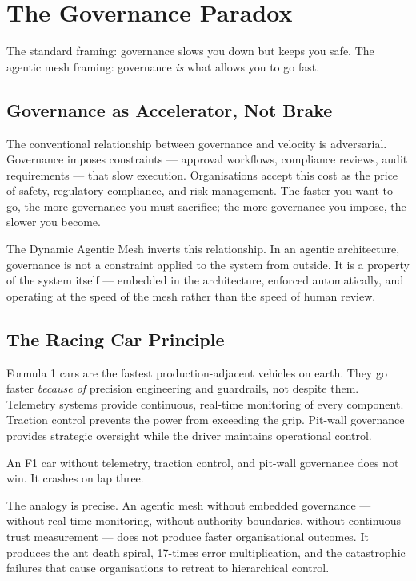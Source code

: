 \chapter{The Governance Paradox}
\label{ch:governance}

\epigraph{The standard framing: governance slows you down but keeps you safe. The agentic mesh framing: governance \emph{is} what allows you to go fast.}{}

\section{Governance as Accelerator, Not Brake}

The conventional relationship between governance and velocity is adversarial. Governance imposes constraints --- approval workflows, compliance reviews, audit requirements --- that slow execution. Organisations accept this cost as the price of safety, regulatory compliance, and risk management. The faster you want to go, the more governance you must sacrifice; the more governance you impose, the slower you become.

The Dynamic Agentic Mesh inverts this relationship. In an agentic architecture, governance is not a constraint applied to the system from outside. It is a property of the system itself --- embedded in the architecture, enforced automatically, and operating at the speed of the mesh rather than the speed of human review.

\section{The Racing Car Principle}

Formula 1 cars are the fastest production-adjacent vehicles on earth. They go faster \emph{because of} precision engineering and guardrails, not despite them. Telemetry systems provide continuous, real-time monitoring of every component. Traction control prevents the power from exceeding the grip. Pit-wall governance provides strategic oversight while the driver maintains operational control.

An F1 car without telemetry, traction control, and pit-wall governance does not win. It crashes on lap three.

The analogy is precise. An agentic mesh without embedded governance --- without real-time monitoring, without authority boundaries, without continuous trust measurement --- does not produce faster organisational outcomes. It produces the ant death spiral, 17-times error multiplication, and the catastrophic failures that cause organisations to retreat to hierarchical control.

